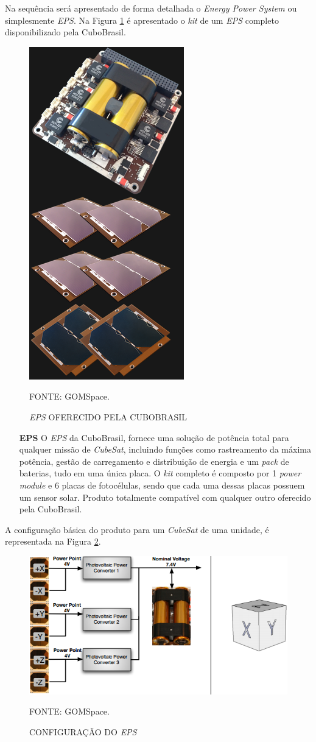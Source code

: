 \documentclass[
	12pt,				%
	openright,			%
	oneside,			%
	a4paper,			%
	english,			%
	french,				%
	spanish,			%
	brazil				%
	]{abntex2}
\begin{document}
	Na sequência será apresentado de forma detalhada o \textit{Energy Power System} ou simplesmente \textit{EPS}. Na Figura \ref{produtos} é apresentado o \textit{kit} de um \textit{EPS} completo disponibilizado pela CuboBrasil.
	
		\begin{figure}[th]
		\caption{\textit{EPS} OFERECIDO PELA CUBOBRASIL}
		\label{produtos}
		\centering
		\includegraphics[width=0.3\linewidth]{./figs/produtos}
		
		\begin{small}
			FONTE: GOMSpace.
		\end{small}
	\end{figure}\pagebreak
	
	\begin{itemize}
		\item[\textbf{EPS}]
		O \textit{EPS} da CuboBrasil, fornece uma solução de potência total para qualquer missão de \textit{CubeSat}, incluindo funções como rastreamento da máxima potência, gestão de carregamento e distribuição de energia e um \textit{pack} de baterias, tudo em uma única placa. O \textit{kit} completo é composto por 1 \textit{power module} e 6 placas de fotocélulas, sendo que cada uma dessas placas possuem um sensor solar. Produto totalmente compatível com qualquer outro oferecido pela CuboBrasil.
	\end{itemize}
	
	A configuração básica do produto para um \textit{CubeSat} de uma unidade, é representada na Figura \ref{configuracao}.
	
	\begin{figure}[th]
		\caption{CONFIGURAÇÃO DO \textit{EPS}}
		\label{configuracao}
		\centering
		\includegraphics[width=0.55\linewidth]{./figs/configuracao}
		
		\begin{small}
			FONTE: GOMSpace.
		\end{small}
	\end{figure}
	
\end{document}

